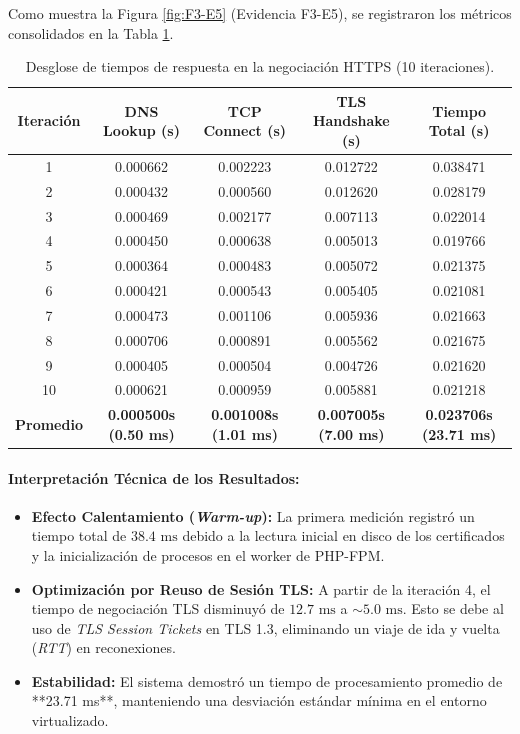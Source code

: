 \documentclass[12pt,a4paper]{article}
\begin{document}
Como muestra la Figura \ref{fig:F3-E5} (Evidencia F3-E5), se registraron los métricos consolidados en la Tabla \ref{tab:rendimiento}.

\begin{table}[h!]
\centering
\small
{}
\begin{tabular}{|c|c|c|c|c|}
\hline
\rowcolor{NavyPrimary} \color{white}\textbf{Iteración} & \color{white}\textbf{DNS Lookup (s)} & \color{white}\textbf{TCP Connect (s)} & \color{white}\textbf{TLS Handshake (s)} & \color{white}\textbf{Tiempo Total (s)} \\ \hline
1 & 0.000662 & 0.002223 & 0.012722 & 0.038471 \\ \hline
2 & 0.000432 & 0.000560 & 0.012620 & 0.028179 \\ \hline
3 & 0.000469 & 0.002177 & 0.007113 & 0.022014 \\ \hline
4 & 0.000450 & 0.000638 & 0.005013 & 0.019766 \\ \hline
5 & 0.000364 & 0.000483 & 0.005072 & 0.021375 \\ \hline
6 & 0.000421 & 0.000543 & 0.005405 & 0.021081 \\ \hline
7 & 0.000473 & 0.001106 & 0.005936 & 0.021663 \\ \hline
8 & 0.000706 & 0.000891 & 0.005562 & 0.021675 \\ \hline
9 & 0.000405 & 0.000504 & 0.004726 & 0.021620 \\ \hline
10 & 0.000621 & 0.000959 & 0.005881 & 0.021218 \\ \hline
\textbf{Promedio} & \textbf{0.000500s (0.50 ms)} & \textbf{0.001008s (1.01 ms)} & \textbf{0.007005s (7.00 ms)} & \textbf{0.023706s (23.71 ms)} \\ \hline
\end{tabular}
\caption{Desglose de tiempos de respuesta en la negociación HTTPS (10 iteraciones).}
\label{tab:rendimiento}
\end{table}

\paragraph{Interpretación Técnica de los Resultados:}
\begin{itemize}[leftmargin=1.5em]
    \item \textbf{Efecto Calentamiento (\textit{Warm-up}):} La primera medición registró un tiempo total de $38.4\text{ ms}$ debido a la lectura inicial en disco de los certificados y la inicialización de procesos en el worker de PHP-FPM.
    \item \textbf{Optimización por Reuso de Sesión TLS:} A partir de la iteración 4, el tiempo de negociación TLS disminuyó de $12.7\text{ ms}$ a $\sim 5.0\text{ ms}$. Esto se debe al uso de \textit{TLS Session Tickets} en TLS 1.3, eliminando un viaje de ida y vuelta (\textit{RTT}) en reconexiones.
    \item \textbf{Estabilidad:} El sistema demostró un tiempo de procesamiento promedio de **23.71 ms**, manteniendo una desviación estándar mínima en el entorno virtualizado.
\end{itemize}
\end{document}
